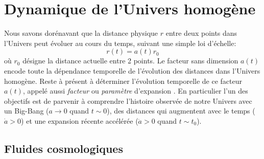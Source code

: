 
\chapter{Dynamique de l'Univers homogène}
Nous savons dorénavant que la distance physique  $r$ entre deux points dans l'Univers peut évoluer au cours du temps, suivant une simple loi d'échelle:
\begin{equation}
r(t)=a(t)r_0
\end{equation}
où $r_0$ désigne la distance actuelle entre 2 points. Le facteur sans dimension $a(t)$ encode toute la dépendance temporelle de l'évolution des distances dans l'Univers homogène. Reste à présent à déterminer l'évolution temporelle de ce facteur $a(t)$, appelé aussi \textit{facteur} ou \textit{paramètre} d'expansion .
En particulier l'un des objectifs est de parvenir à comprendre l'histoire observée de notre Univers avec un Big-Bang ($a\rightarrow 0$ quand $t\sim 0$), des distances qui augmentent avec le temps ($\dot a>0$) et une expansion récente accélérée ($\ddot a>0$ quand $t\sim t_0$).

\section{Fluides cosmologiques}

